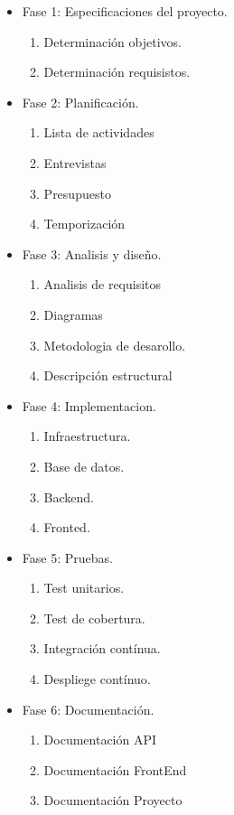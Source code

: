 \begin{itemize}
  \item Fase 1: Especificaciones del proyecto.
    \begin{enumerate}
      \item Determinación objetivos.
      \item Determinación requisistos.
    \end{enumerate}
  \item Fase 2: Planificación.
    \begin{enumerate}
      \item Lista de actividades
      \item Entrevistas
      \item Presupuesto
      \item Temporización
    \end{enumerate}
  \item Fase 3: Analisis y diseño.
    \begin{enumerate}
      \item Analisis de requisitos
      \item Diagramas
      \item Metodologia de desarollo.
      \item Descripción estructural
    \end{enumerate}
  \item Fase 4: Implementacion.
    \begin{enumerate}
      \item Infraestructura.
      \item Base de datos.
      \item Backend.
      \item Fronted.
    \end{enumerate}
  \item Fase 5: Pruebas.
    \begin{enumerate}
      \item Test unitarios.
      \item Test de cobertura.
      \item Integración contínua.
      \item Despliege contínuo.
    \end{enumerate}
  \item Fase 6: Documentación.
    \begin{enumerate}
      \item Documentación API
      \item Documentación FrontEnd
      \item Documentación Proyecto
    \end{enumerate}
\end{itemize}


